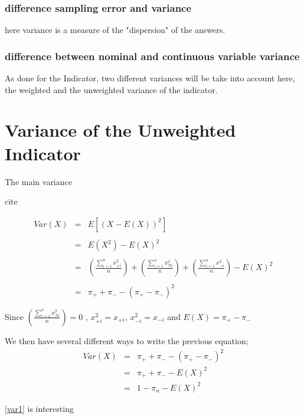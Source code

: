 \documentclass[12pt,a4paper,oneside]{book}
\begin{document}
\subsubsection{difference sampling error and variance}

here variance is a measure of the "dispersion" of the answers.

\subsubsection{difference between nominal and continuous variable variance}


As done for the Indicator, two different variances will be take into account here, the weighted and the unweighted variance of the indicator.


\section{Variance of the Unweighted Indicator}

The main variance

cite

\begin{eqnarray}
     Var(X) &=& E \left[ \left(X-E(X) \right)^2 \right] \nonumber \\ \nonumber \\
     &=& E\left( X^2\right) - E\left( X\right)^2 \nonumber \\ \nonumber \\
     &=& \left( \frac{\sum_{i=1}^n x_{+i}^2}{n} \right) + \left( \frac{\sum_{i=1}^n x_{Ni}^2}{n} \right) + \left( \frac{\sum_{i=1}^n x_{-i}^2}{n} \right) - E(X)^2  \nonumber \\ \nonumber \\
     &=& \pi_+ + \pi_- - ( \pi_+ - \pi_- )^2 \label{var1}
\end{eqnarray}

Since $\left( \frac{\sum_{i=1}^n x_{Ni}^2}{n} \right) = 0$ ,
$x_{+i}^2 = x_{+i}$, $x_{-i}^2 = x_{-i}$
and $E(X) = \pi_+ - \pi_-$


We then have several different ways to write the previous equation;
\begin{eqnarray}
Var(X) &=& \pi_+ + \pi_- - ( \pi_+ - \pi_- )^2 \nonumber \\
	&=& \pi_+ + \pi_- - E ( X )^2 \label{var2} \\
	&=& 1 - \pi_n - E(X)^2 \label{var3}
\end{eqnarray}

\autoref{var1} is interesting 
\end{document}
